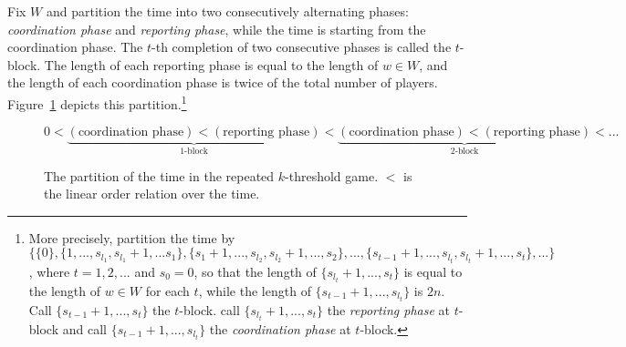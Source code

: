 \documentclass[12pt,letter]{article}
\theoremstyle{definition}
\theoremstyle{definition}
\theoremstyle{remark}
\theoremstyle{claim}
\begin{document}
Fix $W$ and partition the time into two consecutively alternating phases: \textit{coordination phase} and \textit{reporting phase}, while the time is starting from the coordination phase. The $t$-th completion of two consecutive phases is called the $t$-block. The length of each reporting phase is equal to the length of $w\in W$, and the length of each coordination phase is twice of the total number of players. Figure~\ref{fig:ordered_original_game_intro} depicts this partition.\footnote{More precisely, partition the time by $\{\{0\},\{1,...,s_{l_1},s_{l_1}+1,...s_1\},\{s_1+1,...,s_{l_2},s_{l_2}+1,...,s_2\},...,\{s_{t-1}+1,...,s_{l_{t}},s_{l_t}+1,...,s_t\},...\}$, where $t=1,2,...$ and $s_{0}=0$, so that the length of $\{s_{l_t}+1,...,s_t\}$ is equal to the length of $w\in W$ for each $t$, while the length of $\{s_{t-1}+1,...,s_{l_t}\}$ is $2n$. Call $\{s_{t-1}+1,...,s_t\}$ the $t$-block. call $\{s_{l_t}+1,...,s_t\}$ the \textit{reporting phase} at $t$-block and call $\{s_{t-1}+1,...,s_{l_t}\}$ the \textit{coordination phase} at $t$-block.}

\begin{figure}
\[0<\underbrace{(\text{coordination phase})<(\text{reporting phase})}_{\text{$1$-block}}<\underbrace{(\text{coordination phase})<(\text{reporting phase})}_{\text{$2$-block}}<...\]
\caption{The partition of the time in the repeated $k$-threshold game. $<$ is the linear order relation over the time.}
\label{fig:ordered_original_game_intro}
\end{figure}
\end{document}
